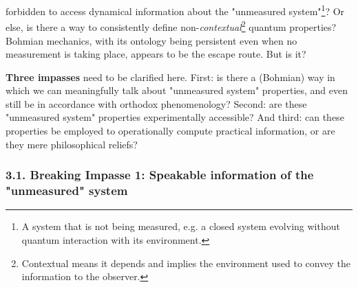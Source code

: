 \documentclass[11pt, a4paper]{article} %
\begin{document}
forbidden to access dynamical information about the "unmeasured system"\footnote{A system that is not being measured, e.g. a closed system evolving without quantum interaction with its environment.}? Or else, is there a way to consistently define non-{\em contextual}\footnote{Contextual means it depends and implies the environment used to convey the information to the observer.} quantum properties? Bohmian mechanics, with its ontology being persistent even when no measurement is taking place, appears to be the escape route. But is it?  \vspace{-0.15cm}

{\bf Three impasses} need to be clarified here. First: is there a (Bohmian) way in which we can meaningfully talk about "unmeasured system" properties, and even still be in accordance with orthodox phenomenology? Second: are these "unmeasured system" properties experimentally accessible? And third: can these properties be employed to operationally compute practical information, or are they mere philosophical reliefs?

\subsubsection*{3.1. Breaking Impasse 1: Speakable information of the "unmeasured" system}\vspace{-0.15cm}
\end{document}
